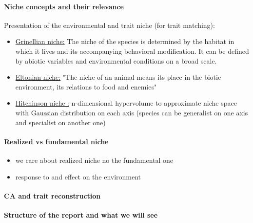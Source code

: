 \paragraph{Niche concepts and their relevance}
Presentation of the environmental and trait niche (for trait matching): 
\begin{itemize}
    \item \underline{Grinellian niche:} \cite{grinnell_geography_1924}The niche of the species is determined by the habitat in which it lives and its accompanying behavioral modification. It can be defined by abiotic variables and environmental conditions on a broad scale.
    \item \underline{Eltonian niche:} \cite{elton_animal_2001} "The niche of an animal means its place in the biotic environment, its relations to food and enemies"
    \item \underline{Hitchinson niche :} \cite{hutchinson_concluding_1957} n-dimensional hypervolume to approximate niche space with Gaussian distribution on each axis (species can be generalist on one axis and specialist on another one)
\end{itemize}


\paragraph{Realized vs fundamental niche}
\begin{itemize}
    \item we care about realized niche no the fundamental one
    \item response to and effect on the environment
\end{itemize}


\paragraph{CA and trait reconstruction}

\paragraph{Structure of the report and what we will see}
